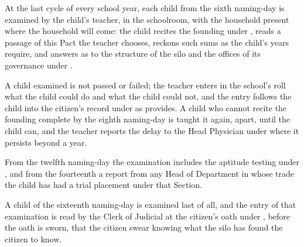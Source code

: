\begin{clauses}
\item At the last cycle of every school year, each child from the sixth naming-day is examined by the child's teacher, in the schoolroom, with the household present where the household will come: the child recites the founding under , reads a passage of this Pact the teacher chooses, reckons such sums as the child's years require, and answers as to the structure of the silo and the offices of its governance under .
\item A child examined is not passed or failed; the teacher enters in the school's roll what the child could do and what the child could not, and the entry follows the child into the citizen's record under  as  provides. A child who cannot recite the founding complete by the eighth naming-day is taught it again, apart, until the child can, and the teacher reports the delay to the Head Physician under  where it persists beyond a year.
\item From the twelfth naming-day the examination includes the aptitude testing under , and from the fourteenth a report from any Head of Department in whose trade the child has had a trial placement under that Section.
\item A child of the sixteenth naming-day is examined last of all, and the entry of that examination is read by the Clerk of Judicial at the citizen's oath under , before the oath is sworn, that the citizen swear knowing what the silo has found the citizen to know.
\end{clauses}

